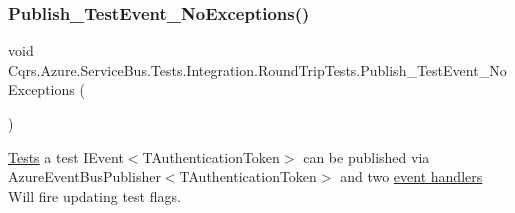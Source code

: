 \subsubsection{\texorpdfstring{Publish\+\_\+\+Test\+Event\+\_\+\+No\+Exceptions()}{Publish\_TestEvent\_NoExceptions()}}
{\footnotesize\ttfamily void Cqrs.\+Azure.\+Service\+Bus.\+Tests.\+Integration.\+Round\+Trip\+Tests.\+Publish\+\_\+\+Test\+Event\+\_\+\+No\+Exceptions (\begin{DoxyParamCaption}{ }\end{DoxyParamCaption})}



\hyperlink{namespaceCqrs_1_1Azure_1_1ServiceBus_1_1Tests}{Tests} a test I\+Event$<$\+T\+Authentication\+Token$>$ can be published via Azure\+Event\+Bus\+Publisher$<$\+T\+Authentication\+Token$>$ and two \hyperlink{}{event handlers} Will fire updating test flags. 

